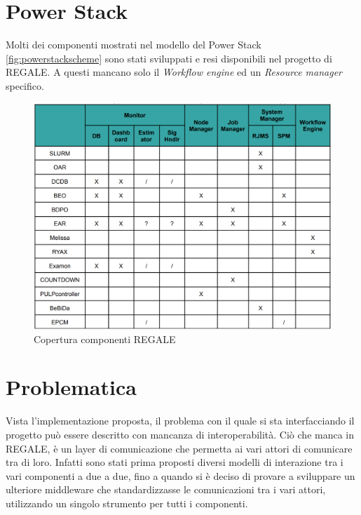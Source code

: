 \section{Power Stack}
Molti dei componenti mostrati nel modello del Power Stack \ref{fig:powerstackscheme} sono stati sviluppati e resi disponibili nel progetto di REGALE. A questi mancano solo il \emph{Workflow engine} ed un \emph{Resource manager} specifico.
\begin{figure}[H]
    \centering
    \includegraphics[width=\textwidth]{./img/REGALE-components.png}
    \caption{Copertura componenti REGALE}
    \label{fig:regale_cover}
\end{figure}
\section{Problematica}
Vista l'implementazione proposta, il problema con il quale si sta interfacciando il progetto può essere descritto con mancanza di interoperabilità. Ciò che manca in REGALE, è un layer di comunicazione che permetta ai vari attori di comunicare tra di loro. Infatti sono stati prima proposti diversi modelli di interazione tra i vari componenti a due a due, fino a quando si è deciso di provare a sviluppare un ulteriore middleware che standardizzasse le comunicazioni tra i vari attori, utilizzando un singolo strumento per tutti i componenti. 

